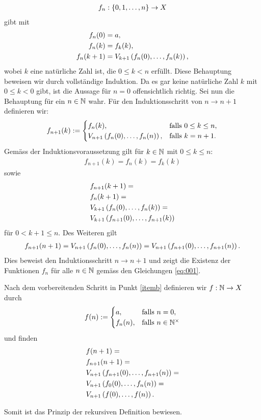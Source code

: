 {\begin{aenum}
\begin{align*}
    f_n:\left\{0,1,\ldots,n\right\}\to X
\end{align*}
gibt mit
\begin{align}\label{eq:001}
    f_n(0) &= a, \nonumber\\
    f_n(k) &= f_k(k), \\
    f_n(k+1) &= V_{k+1}\left(f_n(0),\ldots, f_n(k)\right), \nonumber
\end{align}
wobei $k$ eine natürliche Zahl ist, die $0\leq k < n$ erfüllt. Diese Behauptung beweisen wir durch vollständige Induktion. Da es gar keine natürliche Zahl $k$ mit $0\leq k < 0$ gibt, ist die Aussage für $n=0$ offensichtlich richtig. Sei nun die Behauptung für ein $n\in\mathbb{N}$ wahr. Für den Induktionsschritt von $n\to n+1$ definieren wir:
\begin{align*}
    f_{n+1}(k) :=
    \begin{cases}
    f_n(k), &\text{falls $0\leq k\leq n$}, \\
    V_{n+1}\left(f_n(0),\ldots,f_n(n)\right), &\text{falls $k=n+1$}.
    \end{cases}
\end{align*}
Gemäss der Induktionsvoraussetzung gilt für $k\in\mathbb{N}$ mit $0\leq k\leq n$:
\begin{align*}
    f_{n+1}(k) = f_n(k) = f_k(k)
\end{align*}
sowie
\begin{align*}
    &f_{n+1}(k+1) = \\
    &f_n(k+1) = \\
    &V_{k+1}\left(f_n(0),\ldots, f_n(k)\right) = \\
    &V_{k+1}\left(f_{n+1}(0),\ldots, f_{n+1}(k)\right)
\end{align*}
für $0<k+1\leq n$. Des Weiteren gilt
\begin{align*}
    f_{n+1}(n+1) = V_{n+1}\left(f_n(0),\ldots, f_n(n)\right) = V_{n+1}\left(f_{n+1}(0),\ldots, f_{n+1}(n)\right).
\end{align*}
Dies beweist den Induktionsschritt $n\to n+1$ und zeigt die Existenz der Funktionen $f_n$ für alle $n\in\mathbb{N}$ gemäss den Gleichungen \ref{eq:001}.
\item Nach dem vorbereitenden Schritt in Punkt \ref{itemb} definieren wir $f:\mathbb{N}\to X$ durch
\begin{align*}
    f(n) :=
    \begin{cases}
    a, &\text{falls $n=0$}, \\
    f_n(n), &\text{falls $n\in\mathbb{N}^{\times}$}
    \end{cases}
\end{align*}
und finden
\begin{align*}
    &f(n+1) = \\
    &f_{n+1}(n+1) = \\
    &V_{n+1}\left(f_{n+1}(0),\ldots,f_{n+1}(n)\right) = \\
    &V_{n+1}\left(f_0(0),\ldots,f_n(n)\right) = \\
    &V_{n+1}\left(f(0),\ldots,f(n)\right).
\end{align*}
\end{aenum}
Somit ist das Prinzip der rekursiven Definition bewiesen. \cite{AmannEscher1}
}

